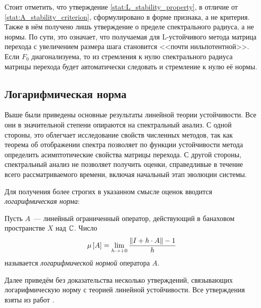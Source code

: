 Стоит отметить, что утверждение \ref{stat:L_stability_property}, в отличие от \ref{stat:A_stability_criterion}, сформулировано в форме признака, а не критерия.
Также в нём получено лишь утверждение о пределе спектрального радиуса, а не нормы.
По сути, это означает, что получаемая для L-устойчивого метода матрица перехода с увеличением размера шага становится <<почти нильпотентной>>.
Если $ F_0 $ диагонализуема, то из стремления к нулю спектрального радиуса матрицы перехода будет автоматически следовать и стремление к нулю её нормы.


\subsection{Логарифмическая норма}
\label{subsec:logarithmic_norm}

Выше были приведены основные результаты линейной теории устойчивости.
Все они в значительной степени опираются на спектральный анализ.
С одной стороны, это облегчает исследование свойств численных методов,
так как теорема об отображении спектра позволяет по функции устойчивости метода
определить асимптотические свойства матрицы перехода.
С другой стороны, спектральный анализ не позволяет получить оценки,
справедливые в течение всего рассматриваемого времени,
включая начальный этап эволюции системы.

Для получения более строгих в указанном смысле оценок вводится \emph{логарифмическая норма}:

\begin{definition}
    \label{def:logarithmic_norm}
    Пусть $ A $~--- линейный ограниченный оператор, действующий в банаховом пространстве $ X $ над $ \mathbb{C} $.
    Число
    \begin{equation}
        \label{eq:logarithmic_norm}
        \mu \left[ A \right] = \lim_{h \to +0} \frac{\| I + h \cdot A \| - 1}{h}
    \end{equation}
    называется \emph{логарифмической нормой} оператора $ A $.
\end{definition}

Далее приведём без доказательства несколько утверждений,
связывающих логарифмическую норму с теорией линейной устойчивости.
Все утверждения взяты из работ \cite{soderlind2006lognorm, lambert1991methods}.

